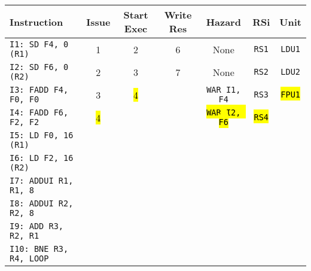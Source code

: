 \begin{enumerate}
    \begin{table}[!htp]
        \centering
        \begin{adjustbox}{width={\textwidth},totalheight={\textheight},keepaspectratio}
        \begin{tabular}{@{} l c c c c c c @{}}
            \toprule
            \textbf{Instruction} & \textbf{Issue} & \textbf{Start Exec} & \textbf{Write Res} & \textbf{Hazard} & \textbf{RSi} & \textbf{Unit} \\
            \midrule
            \texttt{I1: SD F4, 0 (R1)}      & 1 & 2 & 6 & None  & \texttt{RS1}   & \texttt{LDU1}  \\ [.5em]
            \texttt{I2: SD F6, 0 (R2)}      & 2 & 3 & 7 & None  & \texttt{RS2}   & \texttt{LDU2}  \\ [.5em]
            \texttt{I3: FADD F4, F0, F0}    & 3 & \hl{4} &   & \texttt{WAR I1, F4}  & \texttt{RS3} & \hl{\texttt{FPU1}} \\ [.5em]
            \texttt{I4: FADD F6, F2, F2}    & \hl{4} &   &   & \hl{\texttt{WAR I2, F6}} & \hl{\texttt{RS4}} &       \\ [.5em]
            \texttt{I5: LD F0, 16 (R1)}     &   &   &   &       &       &       \\ [.5em]
            \texttt{I6: LD F2, 16 (R2)}     &   &   &   &       &       &       \\ [.5em]
            \texttt{I7: ADDUI R1, R1, 8}    &   &   &   &       &       &       \\ [.5em]
            \texttt{I8: ADDUI R2, R2, 8}    &   &   &   &       &       &       \\ [.5em]
            \texttt{I9: ADD R3, R2, R1}     &   &   &   &       &       &       \\ [.5em]
            \texttt{I10: BNE R3, R4, LOOP}   &   &   &   &       &       &       \\
            \bottomrule
        \end{tabular}
        \end{adjustbox}
    \end{table}
    

\end{enumerate}
